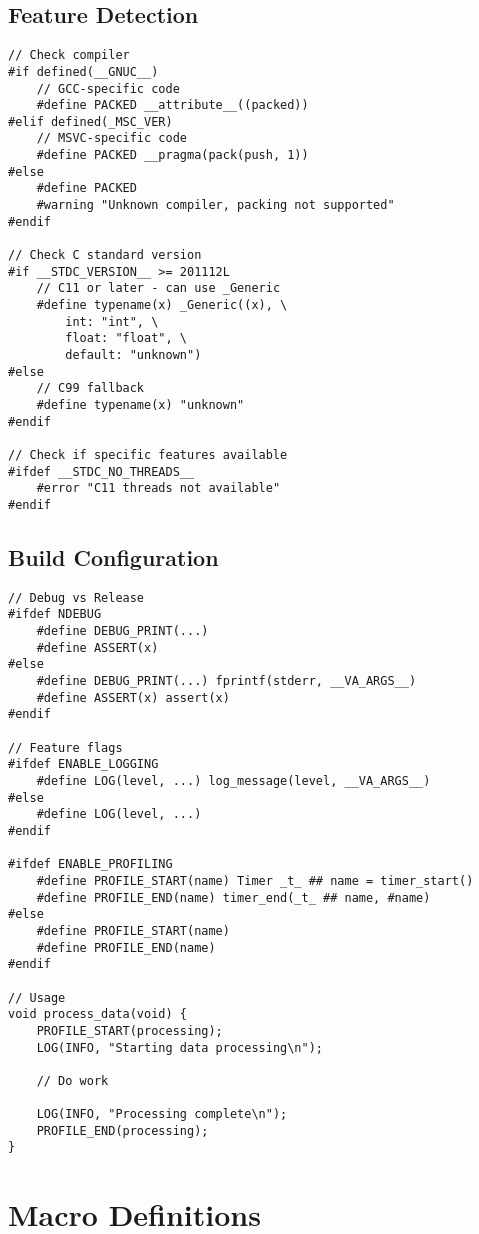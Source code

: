 \subsection{Feature Detection}

\begin{lstlisting}
// Check compiler
#if defined(__GNUC__)
    // GCC-specific code
    #define PACKED __attribute__((packed))
#elif defined(_MSC_VER)
    // MSVC-specific code
    #define PACKED __pragma(pack(push, 1))
#else
    #define PACKED
    #warning "Unknown compiler, packing not supported"
#endif

// Check C standard version
#if __STDC_VERSION__ >= 201112L
    // C11 or later - can use _Generic
    #define typename(x) _Generic((x), \
        int: "int", \
        float: "float", \
        default: "unknown")
#else
    // C99 fallback
    #define typename(x) "unknown"
#endif

// Check if specific features available
#ifdef __STDC_NO_THREADS__
    #error "C11 threads not available"
#endif
\end{lstlisting}

\subsection{Build Configuration}

\begin{lstlisting}
// Debug vs Release
#ifdef NDEBUG
    #define DEBUG_PRINT(...)
    #define ASSERT(x)
#else
    #define DEBUG_PRINT(...) fprintf(stderr, __VA_ARGS__)
    #define ASSERT(x) assert(x)
#endif

// Feature flags
#ifdef ENABLE_LOGGING
    #define LOG(level, ...) log_message(level, __VA_ARGS__)
#else
    #define LOG(level, ...)
#endif

#ifdef ENABLE_PROFILING
    #define PROFILE_START(name) Timer _t_ ## name = timer_start()
    #define PROFILE_END(name) timer_end(_t_ ## name, #name)
#else
    #define PROFILE_START(name)
    #define PROFILE_END(name)
#endif

// Usage
void process_data(void) {
    PROFILE_START(processing);
    LOG(INFO, "Starting data processing\n");

    // Do work

    LOG(INFO, "Processing complete\n");
    PROFILE_END(processing);
}
\end{lstlisting}

\section{Macro Definitions}

